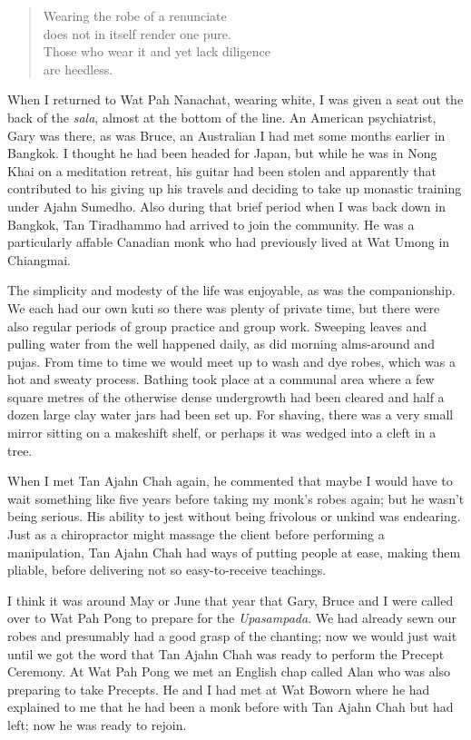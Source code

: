 \begin{quote}
  Wearing the robe of a renunciate\\
  does not in itself render one pure.\\
  Those who wear it and yet lack diligence\\
  are heedless.
\end{quote}

When I returned to Wat Pah Nanachat, wearing white, I was given a seat
out the back of the \emph{sala}, almost at the bottom of the line. An
American psychiatrist, Gary was there, as was Bruce, an Australian I had
met some months earlier in Bangkok. I thought he had been headed for
Japan, but while he was in Nong Khai on a meditation retreat, his guitar
had been stolen and apparently that contributed to his giving up his
travels and deciding to take up monastic training under Ajahn Sumedho.
Also during that brief period when I was back down in Bangkok, Tan
Tiradhammo had arrived to join the community. He was a particularly
affable Canadian monk who had previously lived at Wat Umong in
Chiangmai.

The simplicity and modesty of the life was enjoyable, as was the
companionship. We each had our own kuti so there was plenty of private
time, but there were also regular periods of group practice and group
work. Sweeping leaves and pulling water from the well happened daily, as
did morning alms-around and pujas. From time to time we would meet up to
wash and dye robes, which was a hot and sweaty process. Bathing took
place at a communal area where a few square metres of the otherwise
dense undergrowth had been cleared and half a dozen large clay water
jars had been set up. For shaving, there was a very small mirror sitting
on a makeshift shelf, or perhaps it was wedged into a cleft in a tree.

When I met Tan Ajahn Chah again, he commented that maybe I would have to
wait something like five years before taking my monk's robes again; but
he wasn't being serious. His ability to jest without being frivolous or
unkind was endearing. Just as a chiropractor might massage the client
before performing a manipulation, Tan Ajahn Chah had ways of putting
people at ease, making them pliable, before delivering not so
easy-to-receive teachings.

I think it was around May or June that year that Gary, Bruce and I were
called over to Wat Pah Pong to prepare for the \emph{Upasampada}. We had
already sewn our robes and presumably had a good grasp of the chanting;
now we would just wait until we got the word that Tan Ajahn Chah was
ready to perform the Precept Ceremony. At Wat Pah Pong we met an English
chap called Alan who was also preparing to take Precepts. He and I had
met at Wat Boworn where he had explained to me that he had been a monk
before with Tan Ajahn Chah but had left; now he was ready to rejoin.

